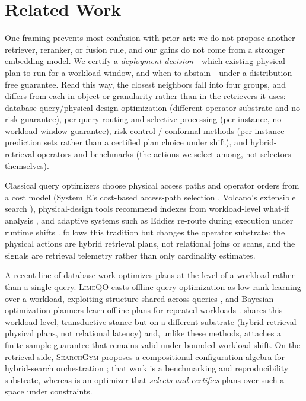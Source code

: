 \section{Related Work}
\label{sec:related}

One framing prevents most confusion with prior art: we do not propose another retriever, reranker, or fusion rule, and our gains do not come from a stronger embedding model. We certify a \emph{deployment decision}---which existing physical plan to run for a workload window, and when to abstain---under a distribution-free guarantee. Read this way, the closest neighbors fall into four groups, and \CWC{} differs from each in object or granularity rather than in the retrievers it uses: database query/physical-design optimization (different operator substrate and no risk guarantee), per-query routing and selective processing (per-instance, no workload-window guarantee), risk control / conformal methods (per-instance prediction sets rather than a certified plan choice under shift), and hybrid-retrieval operators and benchmarks (the actions we select among, not selectors themselves).

Classical query optimizers choose physical access paths and operator orders from a cost model (System R's cost-based access-path selection \cite{selinger1979accesspath}, Volcano's extensible search \cite{graefe1993volcano}), physical-design tools recommend indexes from workload-level what-if analysis \cite{chaudhuri1998autoadmin}, and adaptive systems such as Eddies re-route during execution under runtime shifts \cite{avnur2000eddies}. \WCR{} follows this tradition but changes the operator substrate: the physical actions are hybrid retrieval plans, not relational joins or scans, and the signals are retrieval telemetry rather than only cardinality estimates.

A recent line of database work optimizes plans at the level of a workload rather than a single query. \textsc{LimeQO} casts offline query optimization as low-rank learning over a workload, exploiting structure shared across queries \cite{limeqo2025}, and Bayesian-optimization planners learn offline plans for repeated workloads \cite{bayesqo2025}. \WCR{} shares this workload-level, transductive stance but on a different substrate (hybrid-retrieval physical plans, not relational latency) and, unlike these methods, attaches a finite-sample guarantee that remains valid under bounded workload shift. On the retrieval side, \textsc{SearchGym} proposes a compositional configuration algebra for hybrid-search orchestration \cite{searchgym2026}; that work is a benchmarking and reproducibility substrate, whereas \WCR{} is an optimizer that \emph{selects and certifies} plans over such a space under constraints.

